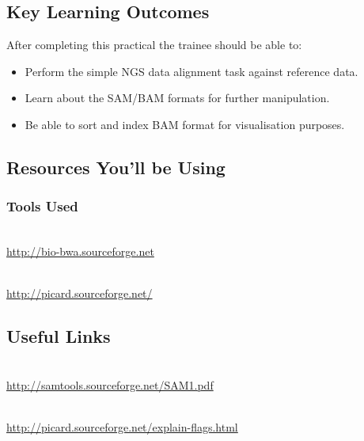 
\setModuleContributions{%
}

\chapter{\moduleTitle}
\newpage

\section{Key Learning Outcomes}

After completing this practical the trainee should be able to:
\begin{itemize}
  \item Perform the simple NGS data alignment task against reference data.
  \item Learn about the SAM/BAM formats for further manipulation. 
  \item Be able to sort and index BAM format for visualisation purposes.
\end{itemize}

\section{Resources You'll be Using}
 
\subsection{Tools Used}
\begin{description}[style=multiline,labelindent=0cm,align=left,leftmargin=0.5cm]
  \item[BWA Burrows-Wheeler Algorithm]\hfill\\
  	\url{http://bio-bwa.sourceforge.net}
  \item[Samtools]\hfill\\
  	\url{http://picard.sourceforge.net/}
\end{description}

\section{Useful Links}
 
\begin{description}[style=multiline,labelindent=0cm,align=left,leftmargin=0.5cm]
  \item[SAM Specification]\hfill\\
    \url{http://samtools.sourceforge.net/SAM1.pdf}
  \item[Explain SAM Flags]\hfill\\
    \url{http://picard.sourceforge.net/explain-flags.html}
\end{description}

